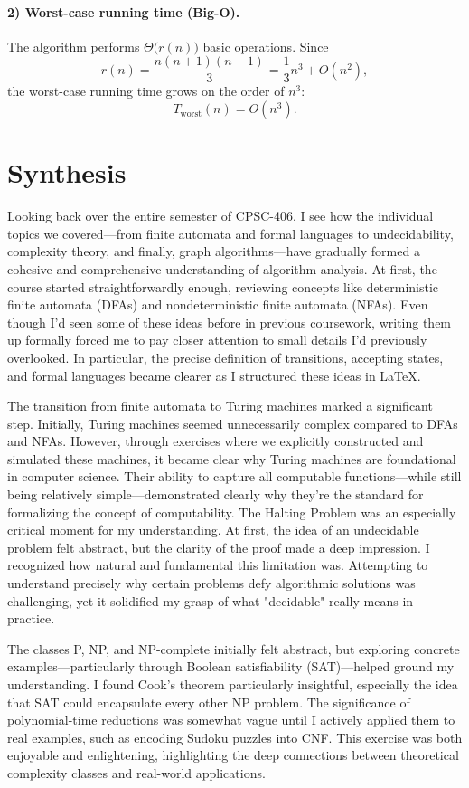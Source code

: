 \documentclass{article}
\theoremstyle{theorem}
\theoremstyle{definition}
\theoremstyle{remark}
\begin{document}
\paragraph{2) Worst-case running time (Big-O).}
The algorithm performs \(\Theta\!\bigl(r(n)\bigr)\) basic operations.
Since
\[
r(n)=\frac{n(n+1)(n-1)}{3}
     =\frac{1}{3}n^{3}+O(n^{2}),
\]
the worst-case running time grows on the order of \(n^{3}\):
\[
\boxed{T_{\text{worst}}(n)=O(n^{3}).}
\]

\newpage

\section{Synthesis}

Looking back over the entire semester of CPSC-406, I see how the individual topics we covered—from finite automata and formal languages to undecidability, complexity theory, and finally, graph algorithms—have gradually formed a cohesive and comprehensive understanding of algorithm analysis. At first, the course started straightforwardly enough, reviewing concepts like deterministic finite automata (DFAs) and nondeterministic finite automata (NFAs). Even though I'd seen some of these ideas before in previous coursework, writing them up formally forced me to pay closer attention to small details I'd previously overlooked. In particular, the precise definition of transitions, accepting states, and formal languages became clearer as I structured these ideas in LaTeX. 

The transition from finite automata to Turing machines marked a significant step. Initially, Turing machines seemed unnecessarily complex compared to DFAs and NFAs. However, through exercises where we explicitly constructed and simulated these machines, it became clear why Turing machines are foundational in computer science. Their ability to capture all computable functions—while still being relatively simple—demonstrated clearly why they're the standard for formalizing the concept of computability. The Halting Problem was an especially critical moment for my understanding. At first, the idea of an undecidable problem felt abstract, but the clarity of the proof made a deep impression. I recognized how natural and fundamental this limitation was. Attempting to understand precisely why certain problems defy algorithmic solutions was challenging, yet it solidified my grasp of what "decidable" really means in practice.

The classes P, NP, and NP-complete initially felt abstract, but exploring concrete examples—particularly through Boolean satisfiability (SAT)—helped ground my understanding. I found Cook's theorem particularly insightful, especially the idea that SAT could encapsulate every other NP problem. The significance of polynomial-time reductions was somewhat vague until I actively applied them to real examples, such as encoding Sudoku puzzles into CNF. This exercise was both enjoyable and enlightening, highlighting the deep connections between theoretical complexity classes and real-world applications.
\end{document}
